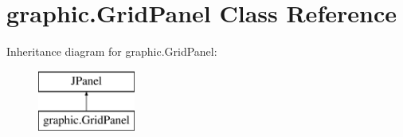 \hypertarget{classgraphic_1_1_grid_panel}{}\section{graphic.\+Grid\+Panel Class Reference}
\label{classgraphic_1_1_grid_panel}
Inheritance diagram for graphic.\+Grid\+Panel\+:\begin{figure}[H]
\begin{center}
\leavevmode
\includegraphics[height=2.000000cm]{classgraphic_1_1_grid_panel}
\end{center}
\end{figure}
